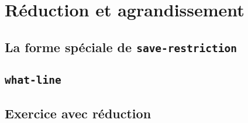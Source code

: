 \chapter{Réduction et agrandissement}

\section{La forme spéciale de \texttt{save-restriction}}

\section{\texttt{what-line}}

\section{Exercice avec réduction}